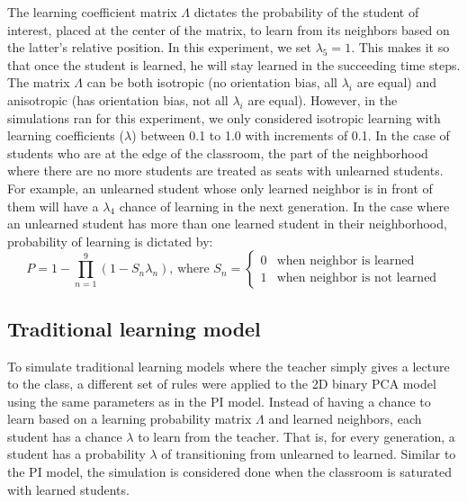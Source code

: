 \documentclass[10pt,a4paper,twoside]{article}
\begin{document}
The learning coefficient matrix $\Lambda$ dictates the probability of the student of interest, placed at the center of the matrix, to learn from its neighbors based on the latter's relative position. In this experiment, we set $\lambda_5 = 1$. This makes it so that once the student is learned, he will stay learned in the succeeding time steps. The matrix $\Lambda$ can be both isotropic (no orientation bias, all $\lambda_i$ are equal) and anisotropic (has orientation bias, not all $\lambda_i$ are equal). However, in the simulations ran for this experiment, we only considered isotropic learning with learning coefficients ($\lambda$) between 0.1 to 1.0 with increments of 0.1.  In the case of students who are at the edge of the classroom, the part of the neighborhood where there are no more students are treated as seats with unlearned students. For example, an unlearned student whose only learned neighbor is in front of them will have a $\lambda_4$ chance of learning in the next generation. In the case where an unlearned student has more than one learned student in their neighborhood, probability of learning is dictated by:
\begin{equation}
  P = 1 - \prod_{n=1}^{9}{(1-S_n\lambda_n)}
  \text{, where } S_n=
  \begin{cases}
    0 & \text{when neighbor is learned}\\
    1 & \text{when neighbor is not learned}
  \end{cases}
  \label{eq:learning probability}
\end{equation}

\subsection{Traditional learning model}
To simulate traditional learning models where the teacher simply gives a lecture to the class, a different set of rules were applied to the 2D binary PCA model using the same parameters as in the PI model. Instead of having a chance to learn based on a learning probability matrix $\Lambda$ and learned neighbors, each student has a chance $\lambda$ to learn from the teacher. That is, for every generation, a student has a probability $\lambda$ of transitioning from unlearned to learned. Similar to the PI model, the simulation is considered done when the classroom is saturated with learned students.
\end{document}
